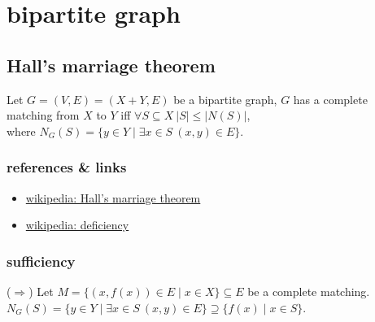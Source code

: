 \documentclass{article}
\begin{document}
\tableofcontents

\newpage

\section{bipartite graph}

\subsection{Hall's marriage theorem}
Let $G=(V,E)=(X+Y,E)$ be a bipartite graph, $G$ has a complete matching from $X$ to $Y$ iff $\forall S\subseteq X\ |S|\leq |N(S)|$,\\
where $N_G(S)=\{y\in Y\mid \exists x\in S\ (x,y)\in E\}$.

\subsubsection{references \& links}

\begin{itemize}
	\item \href{https://en.wikipedia.org/wiki/Hall\%27s\_marriage\_theorem}{wikipedia: Hall's marriage theorem}
	\item \href{https://en.wikipedia.org/wiki/Deficiency_(graph_theory)}{wikipedia: deficiency}
\end{itemize}


\subsubsection{sufficiency}
($\Rightarrow$)\quad
Let $M=\{(x,f(x))\in E\mid x\in X\}\subseteq E$ be a complete matching.\\
$N_G(S)=\{y\in Y\mid \exists x\in S\ (x,y)\in E\}\supseteq \{f(x)\mid x\in S\}$.
\end{document}
